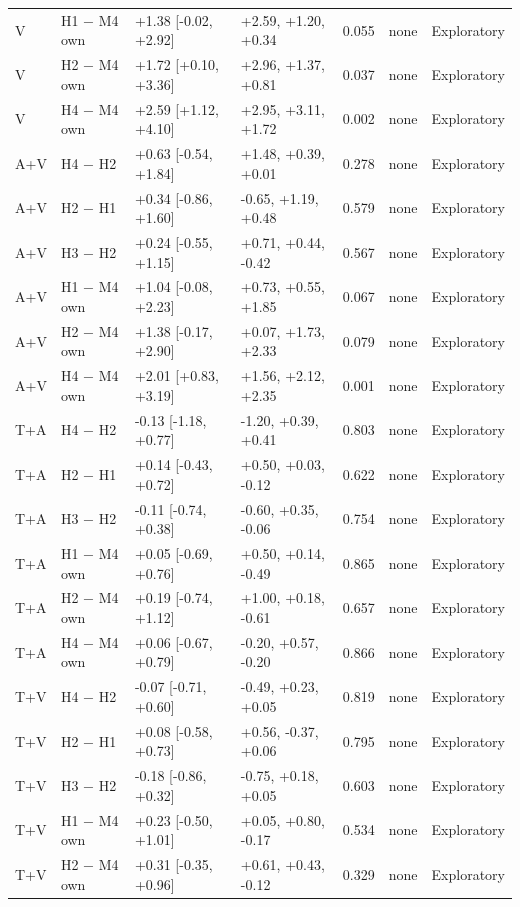 {\begin{longtable}{lllllll}
V & H1 $-$ M4 own & +1.38 [-0.02, +2.92] & +2.59, +1.20, +0.34 & 0.055 & none & Exploratory \\
V & H2 $-$ M4 own & +1.72 [+0.10, +3.36] & +2.96, +1.37, +0.81 & 0.037 & none & Exploratory \\
V & H4 $-$ M4 own & +2.59 [+1.12, +4.10] & +2.95, +3.11, +1.72 & 0.002 & none & Exploratory \\
A+V & H4 $-$ H2 & +0.63 [-0.54, +1.84] & +1.48, +0.39, +0.01 & 0.278 & none & Exploratory \\
A+V & H2 $-$ H1 & +0.34 [-0.86, +1.60] & -0.65, +1.19, +0.48 & 0.579 & none & Exploratory \\
A+V & H3 $-$ H2 & +0.24 [-0.55, +1.15] & +0.71, +0.44, -0.42 & 0.567 & none & Exploratory \\
A+V & H1 $-$ M4 own & +1.04 [-0.08, +2.23] & +0.73, +0.55, +1.85 & 0.067 & none & Exploratory \\
A+V & H2 $-$ M4 own & +1.38 [-0.17, +2.90] & +0.07, +1.73, +2.33 & 0.079 & none & Exploratory \\
A+V & H4 $-$ M4 own & +2.01 [+0.83, +3.19] & +1.56, +2.12, +2.35 & 0.001 & none & Exploratory \\
T+A & H4 $-$ H2 & -0.13 [-1.18, +0.77] & -1.20, +0.39, +0.41 & 0.803 & none & Exploratory \\
T+A & H2 $-$ H1 & +0.14 [-0.43, +0.72] & +0.50, +0.03, -0.12 & 0.622 & none & Exploratory \\
T+A & H3 $-$ H2 & -0.11 [-0.74, +0.38] & -0.60, +0.35, -0.06 & 0.754 & none & Exploratory \\
T+A & H1 $-$ M4 own & +0.05 [-0.69, +0.76] & +0.50, +0.14, -0.49 & 0.865 & none & Exploratory \\
T+A & H2 $-$ M4 own & +0.19 [-0.74, +1.12] & +1.00, +0.18, -0.61 & 0.657 & none & Exploratory \\
T+A & H4 $-$ M4 own & +0.06 [-0.67, +0.79] & -0.20, +0.57, -0.20 & 0.866 & none & Exploratory \\
T+V & H4 $-$ H2 & -0.07 [-0.71, +0.60] & -0.49, +0.23, +0.05 & 0.819 & none & Exploratory \\
T+V & H2 $-$ H1 & +0.08 [-0.58, +0.73] & +0.56, -0.37, +0.06 & 0.795 & none & Exploratory \\
T+V & H3 $-$ H2 & -0.18 [-0.86, +0.32] & -0.75, +0.18, +0.05 & 0.603 & none & Exploratory \\
T+V & H1 $-$ M4 own & +0.23 [-0.50, +1.01] & +0.05, +0.80, -0.17 & 0.534 & none & Exploratory \\
T+V & H2 $-$ M4 own & +0.31 [-0.35, +0.96] & +0.61, +0.43, -0.12 & 0.329 & none & Exploratory \\

\end{longtable}}

